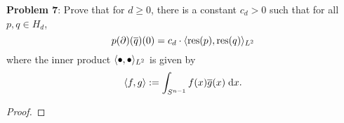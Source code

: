 \documentclass{amsart}
\DeclareMathOperator{\res}{res}
\begin{document}
	\newpage 
	\noindent \textbf{Problem 7}: Prove that for $d\geq 0$, there is a constant $c_d>0$ such that for all $p,q\in H_d$, 
	$$p(\partial)(\overline{q})(0) = c_d \cdot \<\res(p),\res(q)\>_{L^2}$$
	where the inner product $\langle\bullet,\bullet\rangle_{L^2}$ is given by 
	$$
	\langle f,g\rangle := \int_{S^{n-1}} f(x)\overline{g}(x)
 \; \textrm{d} x.$$
 
 \begin{proof}
 	
 \end{proof}
		 
\end{document}
